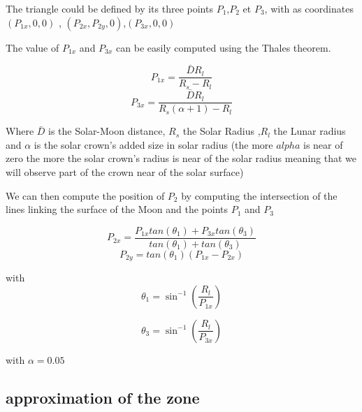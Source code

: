 \documentclass{article} %
\begin{document}
		The triangle could be defined by its three points
		$P_1$,$P_2$ et $P_3$, with as coordinates $(P_{1x},0,0)$ , $(P_{2x},P_{2y},0)$,$(P_{3x},0,0)$ 
		
		
		The value of $P_{1x}$ and $P_{3x}$ can be easily computed using the Thales theorem.
		
		
		$$	
		P_{1x}=\frac{\bar{D}R_l}{R_s-R_l}
		$$ 
		$$	
		P_{3x}=\frac{\bar{D}R_l}{R_s(\alpha+1)-R_l}
		$$
		
		Where $\bar{D}$ is the Solar-Moon distance, $R_s$ the Solar Radius ,$R_l$ the Lunar radius and $\alpha$ is the solar crown's added size in solar radius (the more $alpha$ is near of zero the more the solar crown's radius is near of the solar radius meaning that we will observe part of the crown near of the solar surface)
		
		We can then compute the position of $P_2$ by computing the intersection of the lines linking the surface of the Moon and the points $P_1$ and $P_3$
		
		
		$$
		P_{2x}=\frac{P_{1x}tan(\theta_1) + P_{3x}tan(\theta_3)}{tan(\theta_1) + tan(\theta_3)}
		$$
		$$
		P_{2y}=tan(\theta_1)(P_{1x}-P_{2x})
		$$
		
		with
		$$
		\theta_1=\sin^{-1}\left(\frac{R_l}{P_{1x}}\right)
		$$
		
		$$
		\theta_3=\sin^{-1}\left(\frac{R_l}{P_{3x}}\right)
		$$
		
		with $\alpha=0.05$
		
		\subsection{approximation of the zone}
		
\end{document}
